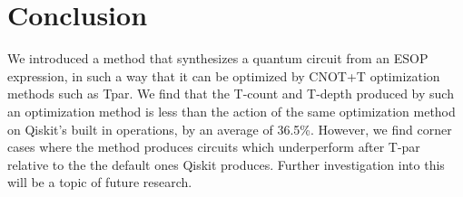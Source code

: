 \section{Conclusion}
We introduced a method that synthesizes a quantum circuit from an ESOP expression, in such a way that
it can be optimized by CNOT+T optimization methods such as Tpar. We find that the T-count
and T-depth produced by such an optimization method is less than the action of the same optimization
method on Qiskit's built in operations, by an average of 36.5\%. However, we find corner cases where
the method produces circuits which underperform after T-par relative to the the default ones Qiskit
produces. Further investigation into this will be a topic of future research.
\label{Conc}
